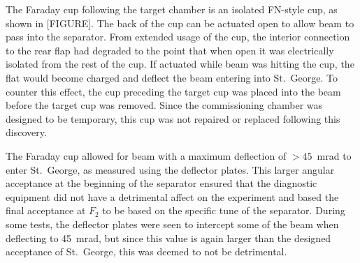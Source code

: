 The Faraday cup following the target chamber is an isolated FN-style cup, as
shown in [FIGURE]. The back of the cup can be actuated open to allow beam to
pass into the separator. From extended usage of the cup, the interior
connection to the rear flap had degraded to the point that when open it was
electrically isolated from the rest of the cup. If actuated while beam was
hitting the cup, the flat would become charged and deflect the beam entering
into St.\ George. To counter this effect, the cup preceding the target cup was
placed into the beam before the target cup was removed. Since the commissioning
chamber was designed to be temporary, this cup was not repaired or replaced
following this discovery.

The Faraday cup allowed for beam with a maximum deflection of $>45$~mrad to
enter St.\ George, as measured using the deflector plates. This larger angular
acceptance at the beginning of the separator ensured that the diagnostic
equipment did not have a detrimental affect on the experiment and based the
final acceptance at $F_2$ to be based on the specific tune of the separator.
During some tests, the deflector plates were seen to intercept some of the beam
when deflecting to 45~mrad, but since this value is again larger than the
designed acceptance of St.\ George, this was deemed to not be detrimental.
